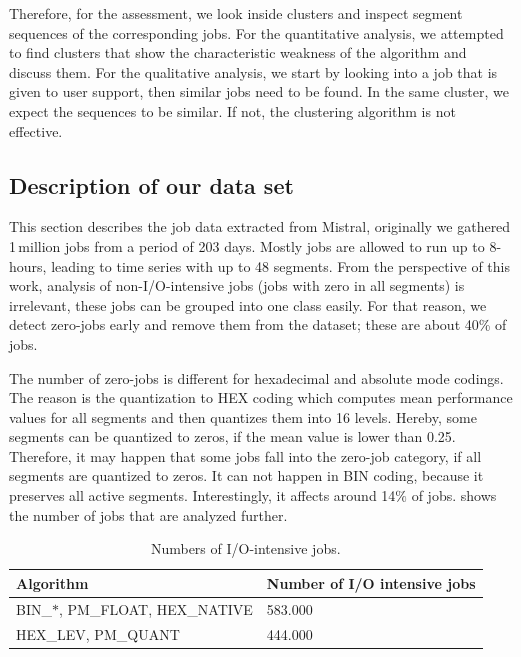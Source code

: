 \documentclass[]{llncs}
\begin{document}
Therefore, for the assessment, we look inside clusters and inspect segment sequences of the corresponding jobs.
For the quantitative analysis, we attempted to find clusters that show the characteristic weakness of the algorithm and discuss them.
For the qualitative analysis, we start by looking into a job that is given to user support, then similar jobs need to be found.
In the same cluster, we expect the sequences to be similar.
If not, the clustering algorithm is not effective.

\subsection{Description of our data set}

This section describes the job data extracted from Mistral, originally we gathered 1\,million jobs from a period of 203 days.
Mostly jobs are allowed to run up to 8-hours, leading to time series with up to 48 segments.
From the perspective of this work, analysis of non-I/O-intensive jobs (jobs with zero in all segments) is irrelevant, these jobs can be grouped into one class easily.
For that reason, we detect zero-jobs early and remove them from the dataset; these are about 40\% of jobs.

The number of zero-jobs is different for hexadecimal and absolute mode codings.
The reason is the quantization to HEX coding which computes mean performance values for all segments and then quantizes them into 16 levels.
Hereby, some segments can be quantized to zeros, if the mean value is lower than 0.25.
Therefore, it may happen that some jobs fall into the zero-job category, if all segments are quantized to zeros.
It can not happen in BIN coding, because it preserves all active segments.
Interestingly, it affects around 14$\%$ of jobs.
 shows the number of jobs that are analyzed further.

\begin{table}
  \centering
  \begin{tabular}{ll}
    Algorithm & Number of I/O intensive jobs \\
    \hline
    BIN\_$\ast$, PM\_FLOAT, HEX\_NATIVE &  583.000 \\
    HEX\_LEV, PM\_QUANT &  444.000 \\
  \end{tabular}
  \caption{Numbers of I/O-intensive jobs.}
  \label{tab:n_intensive_jobs}
\end{table}
\end{document}
